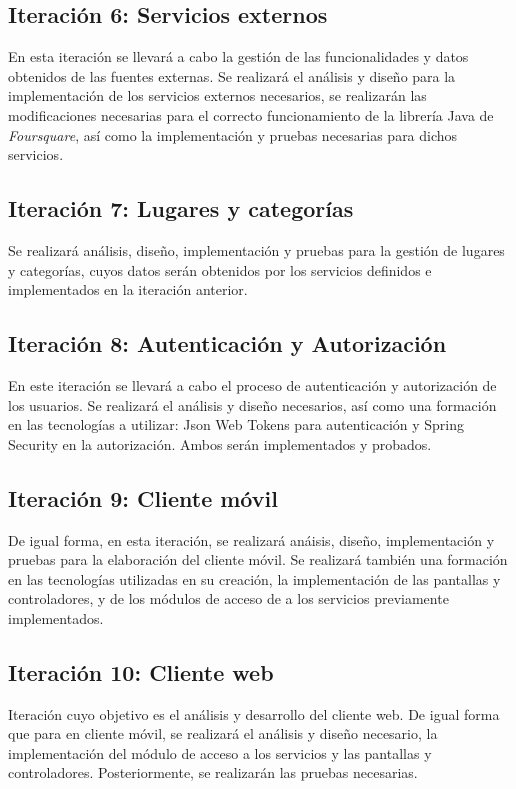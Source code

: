 \subsection{Iteración 6: Servicios externos}
En esta iteración se llevará a cabo la gestión de las funcionalidades y datos obtenidos de las fuentes externas. Se realizará el análisis y diseño para la implementación de los servicios externos necesarios, se realizarán las modificaciones necesarias para el correcto funcionamiento de la librería Java de \textit{Foursquare}, así como la implementación y pruebas necesarias para dichos servicios.


\subsection{Iteración 7: Lugares y categorías}
Se realizará análisis, diseño, implementación y pruebas para la gestión de lugares y categorías, cuyos datos serán obtenidos por los servicios definidos e implementados en la iteración anterior.


\subsection{Iteración 8: Autenticación y Autorización}
En este iteración se llevará a cabo el proceso de autenticación y autorización de los usuarios. Se realizará el análisis y diseño necesarios, así como una formación en las tecnologías a utilizar: Json Web Tokens para autenticación y Spring Security en la autorización. Ambos serán implementados y probados.


\subsection{Iteración 9: Cliente móvil}
De igual forma, en esta iteración, se realizará anáisis, diseño, implementación y pruebas para la elaboración del cliente móvil. Se realizará también una formación en las tecnologías utilizadas en su creación, la implementación de las pantallas y controladores, y de los módulos de acceso de a los servicios previamente implementados.


\subsection{Iteración 10: Cliente web}
Iteración cuyo objetivo es el análisis y desarrollo del cliente web. De igual forma que para en cliente móvil, se realizará el análisis y diseño necesario, la implementación del módulo de acceso a los servicios y las pantallas y controladores. Posteriormente, se realizarán las pruebas necesarias.


